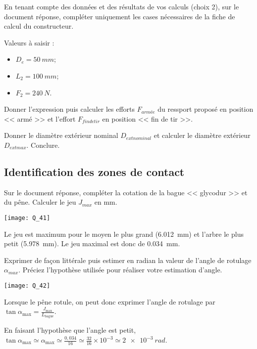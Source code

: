 \documentclass[11pt]{article}
\begin{document}
\UPSTIquestion* En tenant compte des données et des résultats de vos calculs (choix 2), sur le document réponse, compléter uniquement les cases nécessaires de la fiche de calcul du constructeur.

\begin{UPSTIcorrige}
Valeurs à saisir : 
\begin{itemize}
\item $D_e = \SI{50}{mm}$;
\item $L_2 = \SI{100}{mm}$;
\item $F_2 = \SI{240}{N}$.
	\end{itemize}
\end{UPSTIcorrige}

\UPSTIquestion Donner l'expression puis calculer les efforts $F_{armée}$ du ressport proposé en position << armé >> et l'effort $F_{fin de tir}$ en position << fin de tir >>. 

Donner le diamètre extérieur nominal $D_{ext nominal}$ et calculer le diamètre extérieur $D_{ext max}$. Conclure. 
\begin{UPSTIcorrige}
\end{UPSTIcorrige}

\subsection*{Identification des zones de contact}
\UPSTIquestion* Sur le document réponse, compléter la cotation de la bague << glycodur >> et du pêne. Calculer le jeu $J_{max}$ en mm.
\begin{UPSTIcorrige}


\begin{center}
\texttt{[image: Q\_41]}
\end{center}

Le jeu est maximum pour le moyen le plus grand (\SI{6,012}{mm}) et l'arbre le plus petit (\SI{5,978}{mm}). Le jeu maximal est donc de \SI{0,034}{mm}.

\end{UPSTIcorrige}

\UPSTIquestion Exprimer de façon littérale puis estimer en radian la valeur de l'angle de rotulage $\alpha_{max}$.
Préciez l'hypothèse utilisée pour réaliser votre estimation d'angle. 
\begin{UPSTIcorrige}

\begin{center}
\texttt{[image: Q\_42]}
\end{center}

Lorsque le pêne rotule, on peut donc exprimer l'angle de rotulage par $\tan \alpha_{\text{max}} = \frac{J_{\text{max}}}{L_{\text{bague}}}$.

En faisant l'hypothèse que l'angle est petit, 
$\tan \alpha_{\text{max}} \simeq \alpha_{\text{max}} \simeq  \frac{0,034}{16}\simeq  \frac{32}{16} \times 10^{-3}\simeq  \SI{2e-3}{rad}$.
\end{UPSTIcorrige}
\end{document}
